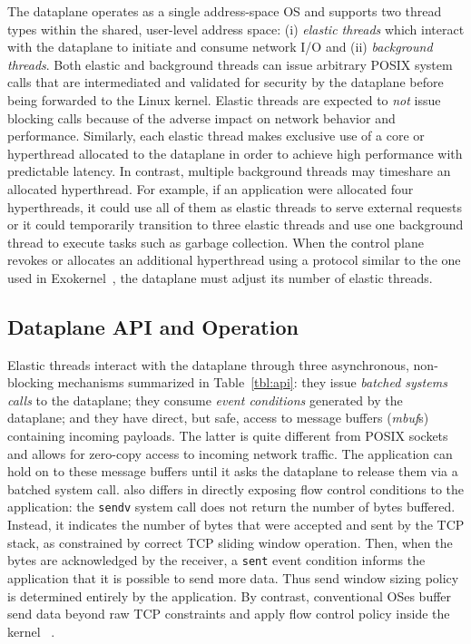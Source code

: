 The \ix dataplane operates as a single address-space OS and supports
two thread types within the shared, user-level address space: (i)
\emph{elastic threads} which interact with the \ix dataplane to
initiate and consume network I/O and (ii) \emph{background threads}.
Both elastic and background threads can issue arbitrary POSIX system
calls that are intermediated and validated for security by the
dataplane before being forwarded to the Linux kernel.  Elastic
threads are expected to \emph{not} issue blocking calls because of the
adverse impact on network behavior and performance. Similarly, each
elastic thread makes exclusive use of a core or hyperthread allocated
to the dataplane in order to achieve high performance with predictable
latency. In contrast, multiple background threads may timeshare an
allocated hyperthread. For example, if an application were
allocated four hyperthreads, it could use all of them as elastic
threads to serve external requests or it could temporarily transition
to three elastic threads and use one background thread to execute
tasks such as garbage collection. When the control plane revokes or
allocates an additional hyperthread using a protocol similar to the
one used in Exokernel~\cite{DBLP:conf/sosp/EnglerKO95}, the dataplane
must adjust its number of elastic threads.


\subsection{Dataplane API and Operation}
\label{sec:impl:kernel}

Elastic threads interact with the \ix dataplane through three
asynchronous, non-blocking mechanisms summarized in
Table~\ref{tbl:api}: they issue \emph{batched systems calls} to the
dataplane; they consume \emph{event conditions} generated by the
dataplane; and they have direct, but safe, access to message buffers
(\emph{mbuf}s) containing incoming payloads.  The latter is quite
different from POSIX sockets and allows for zero-copy access to
incoming network traffic.  The application can hold on to these
message buffers until it asks the dataplane to release them via a
batched system call.  \ix also differs in directly exposing flow
control conditions to the application: the \texttt{sendv} system call
does not return the number of bytes buffered. Instead, it indicates
the number of bytes that were accepted and sent by the TCP
stack, as constrained by correct TCP sliding window operation. Then,
when the bytes are acknowledged by the receiver, a \texttt{sent} event
condition informs the application that it is possible to send more
data. Thus send window sizing policy is determined entirely by the
application.  By contrast, conventional OSes buffer send data beyond
raw TCP constraints and apply flow control policy inside the kernel
~\cite{dynamicwindow}.


